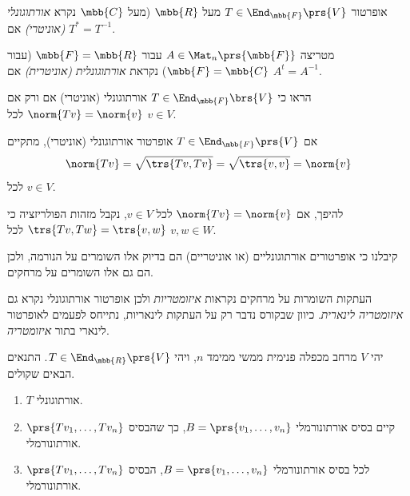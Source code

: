 \documentclass[a4paper,10pt,twoside,openany]{book}
\begin{document}
\begin{definition}
אופרטור
$T \in \End_{\mbb{F}}\prs{V}$
מעל
$\mbb{R}$
(מעל
$\mbb{C}$
נקרא
\emph{אורתוגונלי (אוניטרי)}
אם
$T^* = T^{-1}$.
\end{definition}

\begin{definition}
מטריצה
$A \in \Mat_n\prs{\mbb{F}}$
עבור
$\mbb{F} = \mbb{R}$
(עבור
$\mbb{F} = \mbb{C}$)
נקראת
\emph{אורתוגונלית (אוניטרית)}
אם
$A^t = A^{-1}$.
\end{definition}

\begin{exercisechap}
הראו כי
$T \in \End_{\mbb{F}}\brs{V}$
אורתוגונלי (אוניטרי) אם ורק אם
$\norm{Tv} = \norm{v}$
לכל
$v \in V$.
\end{exercisechap}

\begin{solution}
אם
$T \in \End_{\mbb{F}}\prs{V}$
אופרטור אורתוגונלי (אוניטרי), מתקיים
\[\norm{Tv} = \sqrt{\trs{Tv, Tv}} = \sqrt{\trs{v,v}} = \norm{v}\]
לכל
$v \in V$.

להיפך, אם
$\norm{Tv} = \norm{v}$
לכל
$v \in V$,
נקבל מזהות הפולריזציה כי
$\trs{Tv, Tw} = \trs{v,w}$
לכל
$v,w \in W$.
\end{solution}

\begin{remark}
קיבלנו כי אופרטורים אורתוגונליים (או אוניטריים) הם בדיוק אלו השומרים על הנורמה, ולכן הם גם אלו השומרים על מרחקים.

העתקות השומרות על מרחקים נקראות
\emph{איזומטריות}
ולכן אופרטור אורתוגונלי נקרא גם
\emph{איזומטריה לינארית}.
כיוון שבקורס נדבר רק על העתקות לינאריות, נתייחס לפעמים לאופרטור לינארי בתור
\emph{איזומטריה}.
\end{remark}

\begin{proposition}
יהי
$V$
מרחב מכפלה פנימית ממשי ממימד
$n$,
ויהי
$T \in \End_{\mbb{R}}\prs{V}$.
התנאים הבאים שקולים.

\begin{enumerate}
    \item $T$ אורתוגונלי.

    \item קיים בסיס אורתונורמלי
    $B = \prs{v_1, \ldots, v_n}$,
    כך שהבסיס
    $\prs{T v_1, \ldots, Tv_n}$
    אורתונורמלי.
    
    \item לכל בסיס אורתונורמלי
    $B = \prs{v_1, \ldots, v_n}$,
    הבסיס
    $\prs{T v_1, \ldots, Tv_n}$
    אורתונורמלי.
\end{enumerate}
\end{proposition}
\end{document}
